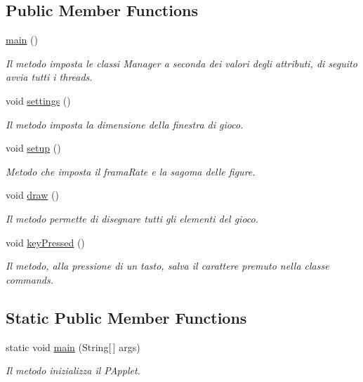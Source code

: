 \subsection*{Public Member Functions}
\begin{DoxyCompactItemize}
\item 
\mbox{\hyperlink{classmain_a51af30a60f9f02777c6396b8247e356f}{main}} ()
\begin{DoxyCompactList}\small\item\em Il metodo imposta le classi Manager a seconda dei valori degli attributi, di seguito avvia tutti i threads. \end{DoxyCompactList}\item 
void \mbox{\hyperlink{classmain_a6071c2f6a6eab58f29a7a5baf3696e6b}{settings}} ()
\begin{DoxyCompactList}\small\item\em Il metodo imposta la dimensione della finestra di gioco. \end{DoxyCompactList}\item 
void \mbox{\hyperlink{classmain_a4fc01d736fe50cf5b977f755b675f11d}{setup}} ()
\begin{DoxyCompactList}\small\item\em Metodo che imposta il frama\+Rate e la sagoma delle figure. \end{DoxyCompactList}\item 
void \mbox{\hyperlink{classmain_a56c5cf8a568cff737ff95520cbe6b405}{draw}} ()
\begin{DoxyCompactList}\small\item\em Il metodo permette di disegnare tutti gli elementi del gioco. \end{DoxyCompactList}\item 
void \mbox{\hyperlink{classmain_a908174a144ef32ef52d3cd01b7194f59}{key\+Pressed}} ()
\begin{DoxyCompactList}\small\item\em Il metodo, alla pressione di un tasto, salva il carattere premuto nella classe commands. \end{DoxyCompactList}\end{DoxyCompactItemize}
\subsection*{Static Public Member Functions}
\begin{DoxyCompactItemize}
\item 
static void \mbox{\hyperlink{classmain_a8b260eecbaabcef8473fd87ada040682}{main}} (String\mbox{[}$\,$\mbox{]} args)
\begin{DoxyCompactList}\small\item\em Il metodo inizializza il P\+Applet. \end{DoxyCompactList}\end{DoxyCompactItemize}
